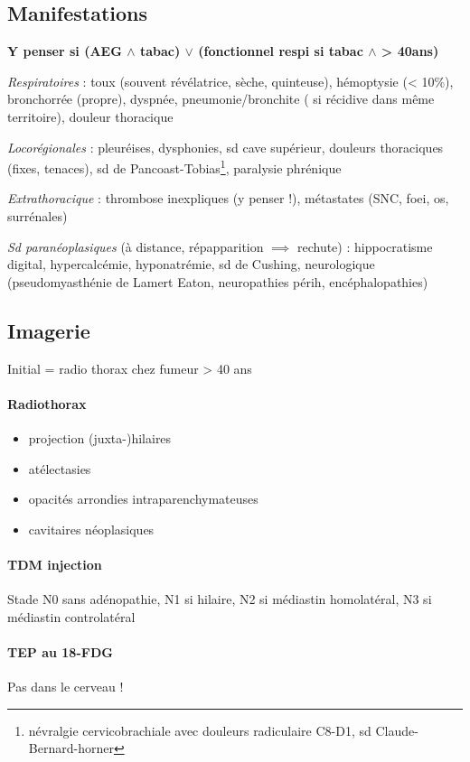 \documentclass{article}
\newcommand*{\TakeFourierOrnament}[1]{{%
\fontencoding{U}\fontfamily{futs}\selectfont\char#1}}
\newcommand*{\danger}{\TakeFourierOrnament{66}}
\begin{document}
\subsection{Manifestations}
\textbf{Y penser si (AEG $\wedge$ tabac) $\vee$ (fonctionnel respi si tabac $\wedge$ >
40ans)}

\textit{Respiratoires}  : toux (souvent révélatrice, sèche, quinteuse), hémoptysie (<
10\%), bronchorrée (propre), dyspnée, pneumonie/bronchite (\danger{} si récidive
dans même territoire), douleur thoracique 

\textit{Locorégionales}  : pleuréises, dysphonies, sd cave supérieur, douleurs thoraciques
(fixes, tenaces), sd de Pancoast-Tobias\footnote{névralgie cervicobrachiale avec
douleurs radiculaire C8-D1, sd Claude-Bernard-horner}, paralysie phrénique

\textit{Extrathoracique}  : thrombose inexpliques (y penser !), métastates (SNC,
foei, os, surrénales)

\textit{Sd paranéoplasiques} (à distance, répapparition $\implies$ rechute) :
hippocratisme digital, hypercalcémie, hyponatrémie, sd de Cushing, neurologique
(pseudomyasthénie de Lamert Eaton, neuropathies périh, encéphalopathies)

\subsection{Imagerie}
Initial = radio thorax chez fumeur > 40 ans
\paragraph{Radiothorax}
\begin{itemize}
  \item projection (juxta-)hilaires
  \item atélectasies
  \item opacités arrondies intraparenchymateuses
  \item cavitaires néoplasiques
\end{itemize}

\paragraph{TDM injection}
Stade N0 sans adénopathie, N1 si hilaire, N2 si médiastin homolatéral, N3 si médiastin
controlatéral

\paragraph{TEP au 18-FDG}
Pas dans le cerveau !
\end{document}
